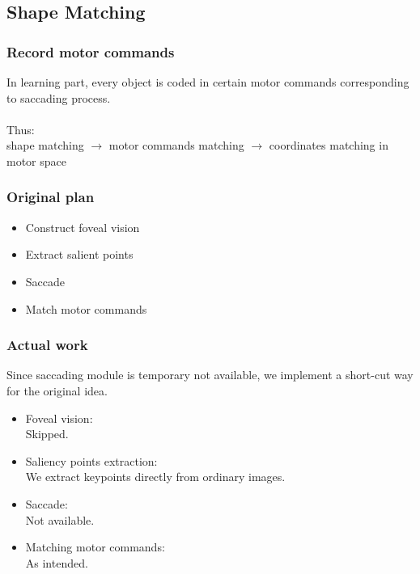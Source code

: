 \documentclass{beamer}
\begin{document}
\subsection{Shape Matching}

\begin{frame}
\frametitle{Record motor commands}
In learning part, every object is coded in certain motor commands corresponding to saccading process.
\\~\\
Thus:\\
shape matching $\to$ motor commands matching $\to$ coordinates matching in motor space

\end{frame}


\begin{frame}
\frametitle{Original plan}
\begin{itemize}
\item Construct foveal vision%
\item Extract salient points%
\item Saccade%
\item Match motor commands%
\end{itemize}
\end{frame}

\begin{frame}
\frametitle{Actual work}
Since saccading module is temporary not available, we implement a short-cut way for the original idea.\\

\begin{itemize}
\item Foveal vision:\\	
Skipped.
\item Saliency points extraction:\\
We extract keypoints directly from ordinary images.
\item Saccade:\\
Not available.
\item Matching motor commands:\\
As intended.  
\end{itemize}
\end{frame}
\end{document}
